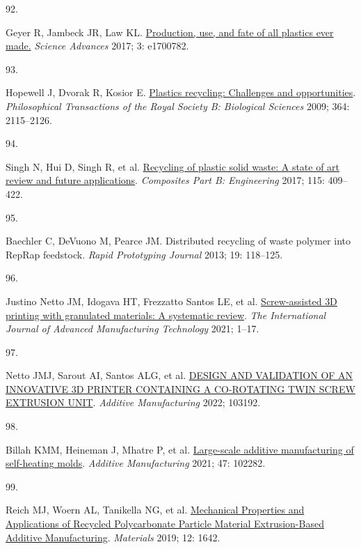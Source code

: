 \documentclass[
  12pt,
  a4paperpaper,
  onecolumn]{article}
\newlength{\cslhangindent}
\newlength{\csllabelwidth}
\newlength{\cslentryspacingunit} %
\newenvironment{CSLReferences}[2] %
 {%
  \setlength{\parindent}{0pt}
  \ifodd #1
  \let\oldpar\par
  \def\par{\hangindent=\cslhangindent\oldpar}
  \fi
  \setlength{\parskip}{#2\cslentryspacingunit}
 }%
 {}
\newcommand{\CSLLeftMargin}[1]{\parbox[t]{\csllabelwidth}{#1}}
\newcommand{\CSLRightInline}[1]{\parbox[t]{\linewidth - \csllabelwidth}{#1}\break}
\begin{document}
\begin{CSLReferences}{0}{0}
\leavevmode{}%
\CSLLeftMargin{92. }%
\CSLRightInline{Geyer R, Jambeck JR, Law KL.
\href{https://doi.org/10.1126/sciadv.1700782}{Production, use, and fate
of all plastics ever made.} \emph{Science Advances} 2017; 3: e1700782.}

\leavevmode{}%
\CSLLeftMargin{93. }%
\CSLRightInline{Hopewell J, Dvorak R, Kosior E.
\href{https://doi.org/10.1098/rstb.2008.0311}{Plastics recycling:
Challenges and opportunities}. \emph{Philosophical Transactions of the
Royal Society B: Biological Sciences} 2009; 364: 2115--2126.}

\leavevmode{}%
\CSLLeftMargin{94. }%
\CSLRightInline{Singh N, Hui D, Singh R, et al.
\href{https://doi.org/10.1016/j.compositesb.2016.09.013}{Recycling of
plastic solid waste: {A} state of art review and future applications}.
\emph{Composites Part B: Engineering} 2017; 115: 409--422.}

\leavevmode{}%
\CSLLeftMargin{95. }%
\CSLRightInline{Baechler C, DeVuono M, Pearce JM. {Distributed recycling
of waste polymer into RepRap feedstock}. \emph{Rapid Prototyping
Journal} 2013; 19: 118--125.}

\leavevmode{}%
\CSLLeftMargin{96. }%
\CSLRightInline{Justino Netto JM, Idogava HT, Frezzatto Santos LE, et
al. \href{https://doi.org/10.1007/s00170-021-07365-z}{Screw-assisted
{3D} printing with granulated materials: A systematic review}. \emph{The
International Journal of Advanced Manufacturing Technology} 2021;
1--17.}

\leavevmode{}%
\CSLLeftMargin{97. }%
\CSLRightInline{Netto JMJ, Sarout AI, Santos ALG, et al.
\href{https://doi.org/10.1016/j.addma.2022.103192}{{DESIGN AND
VALIDATION OF AN INNOVATIVE 3D PRINTER CONTAINING A CO-ROTATING TWIN
SCREW EXTRUSION UNIT}}. \emph{Additive Manufacturing} 2022; 103192.}

\leavevmode{}%
\CSLLeftMargin{98. }%
\CSLRightInline{Billah KMM, Heineman J, Mhatre P, et al.
\href{https://doi.org/10.1016/J.ADDMA.2021.102282}{Large-scale additive
manufacturing of self-heating molds}. \emph{Additive Manufacturing}
2021; 47: 102282.}

\leavevmode{}%
\CSLLeftMargin{99. }%
\CSLRightInline{Reich MJ, Woern AL, Tanikella NG, et al.
\href{https://doi.org/10.3390/ma12101642}{Mechanical {Properties} and
{Applications} of {Recycled Polycarbonate Particle Material
Extrusion-Based Additive Manufacturing}}. \emph{Materials} 2019; 12:
1642.}


\end{CSLReferences}
\end{document}
